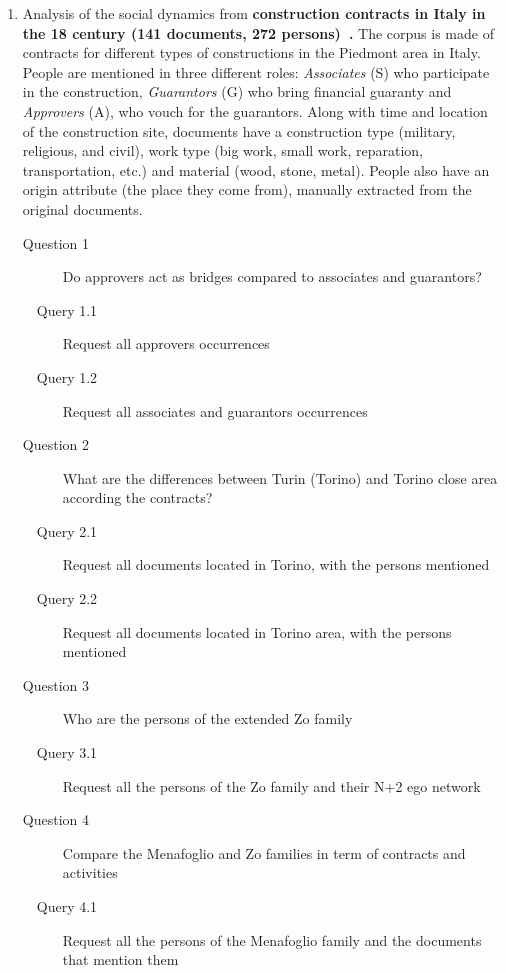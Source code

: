 \newcommand{\pascal}{\#1}
\newcommand{\nicole}{\#2}
\newcommand{\zacarias}{\#3}
\newcommand{\dana}{\#4}
\newcommand{\myindent}{~~} %
\begin{enumerate}
    \item Analysis of the social dynamics from \textbf{construction contracts in Italy in the 18 century (141 documents, 272 persons)~\cite{Cristofoli2018}.}
    The corpus is made of contracts for different types of constructions in the Piedmont area in Italy. People are mentioned in three different roles: \textit{Associates} (S) who participate in the construction, \textit{Guarantors} (G) who bring financial guaranty and \textit{Approvers} (A), who vouch for the guarantors. Along with time and location of the construction site, documents have a construction type (military, religious, and civil), work type (big work, small work, reparation, transportation, etc.) and material (wood, stone, metal). People also have an origin attribute (the place they come from), manually extracted from the original documents.
    \begin{small}
        \begin{description}
            \item[Question 1] Do approvers act as bridges compared to associates and guarantors?
            \item[\myindent Query 1.1] Request all approvers occurrences
            \item[\myindent Query 1.2 ] Request all associates and guarantors occurrences
            \item[Question 2] What are the differences between Turin (Torino) and Torino close area according the contracts?
            \item[\myindent Query 2.1] Request all documents located in Torino, with the persons mentioned
            \item[\myindent Query 2.2] Request all documents located in Torino area, with the persons mentioned
            \item[Question 3] Who are the persons of the extended Zo family
            \item[\myindent Query 3.1] Request all the persons of the Zo family and their N+2 ego network
            \item[Question 4] Compare the Menafoglio and Zo families in term of contracts and activities
            \item[\myindent Query 4.1] Request all the persons of the Menafoglio family and the documents that mention them

\end{description}
\end{small}
\end{enumerate}
